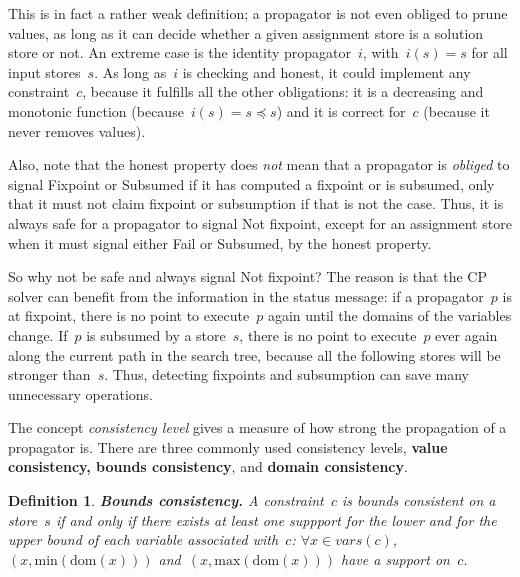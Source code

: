 \documentclass[a4paper,11pt]{article}
\newtheorem{definition}{Definition}
\newcommand{\Dom}[1]{\text{dom}({#1})}
\numberwithin{equation}{section}
\begin{document}
This is in fact a rather weak definition; a propagator is not even
obliged to prune values, as long as it can decide whether a given
assignment store is a solution store or not.
An extreme case is the identity propagator~$i$, with~$i(s) = s$ for all input stores~$s$.
As long as~$i$ is checking and honest, it could implement any constraint~$c$,
because it fulfills all the other obligations: it is a decreasing and monotonic function
(because~$i(s) = s \preceq s$) and it is correct for~$c$ (because it never removes values).

Also, note that the honest property does \emph{not} mean that a
propagator is \emph{obliged} to signal Fixpoint or Subsumed
if it has computed a fixpoint or is subsumed, only that it must not 
claim fixpoint or subsumption if that is not the case.
Thus, it is always safe 
for a propagator to signal Not fixpoint, except for an 
assignment store when it must signal either Fail or Subsumed, by the
honest property. 

So why not be safe and always signal Not fixpoint?
The reason is that the CP solver can benefit from the information
in the status message: if a propagator~$p$ is at fixpoint, there is no point to
execute~$p$ again until the domains of the variables change. If~$p$ is
subsumed by a store~$s$, there is no point to execute~$p$ ever again
along the current path in the search tree, because all the following
stores will be stronger than~$s$. Thus, detecting fixpoints and subsumption
can save many unnecessary operations.

The concept \emph{consistency level} gives a measure of how strong
the propagation of a propagator is.
There are three commonly used consistency levels,
\textbf{value consistency, bounds consistency}, and \textbf{domain consistency}.


\begin{definition}
  \textbf{Bounds consistency.} A constraint~$c$ is bounds consistent on a store~$s$ 
  if and only if there exists at least one suppport for the lower and for the upper bound of
  each variable associated with~$c$: $\forall x \in vars(c)$,~$(x,\text{min}(\Dom{x}))$
  and~$(x,\text{max}(\Dom{x}))$ 
  have a support on~$c$.
\end{definition}
\end{document}
